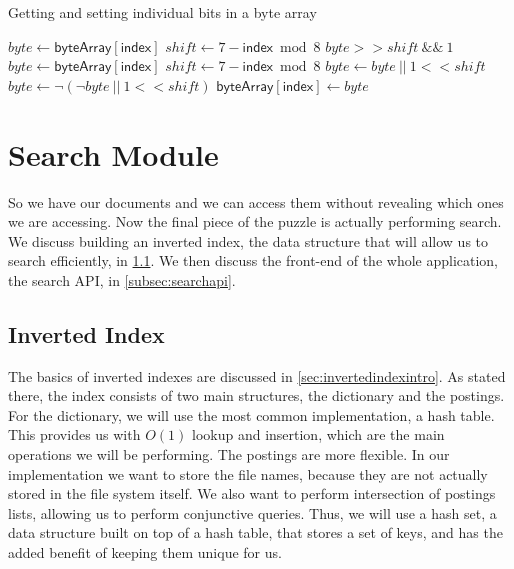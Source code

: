 \documentclass[12pt,a4paper,twoside,openright]{report}
\begin{document}
\begin{algorithm}[t]
\caption{Getting and setting individual bits in a byte array}
\label{alg:bitgetset}
\begin{algorithmic}
\vskip 10pt
  \State $byte \gets \mathsf{byteArray[index]}$
  \State $shift \gets 7 - \mathsf{index} \bmod 8$
  \State \Return $byte >> shift~\&\&~1$
\EndFunction
\vskip 10pt
  \State $byte \gets \mathsf{byteArray[index]}$
  \State $shift \gets 7 - \mathsf{index} \bmod 8$
    \State $byte \gets byte~||~1 << shift$
  \Else
    \State $byte \gets \neg (\neg byte~||~1 << shift)$
  \EndIf
  \State $\mathsf{byteArray[index]} \gets byte$
\EndFunction
\vskip 10pt
\end{algorithmic}
\end{algorithm}

\section{Search Module}
\label{sec:searchmodule}

So we have our documents and we can access them without revealing which ones we are accessing. Now the final piece of the puzzle is actually performing search. We discuss building an inverted index, the data structure that will allow us to search efficiently, in \cref{subsec:invertedindex}. We then discuss the front-end of the whole application, the search API, in \cref{subsec:searchapi}.

\subsection{Inverted Index}
\label{subsec:invertedindex}

The basics of inverted indexes are discussed in \cref{sec:invertedindexintro}. As stated there, the index consists of two main structures, the dictionary and the postings. For the dictionary, we will use the most common implementation, a hash table. This provides us with $O(1)$ lookup and insertion, which are the main operations we will be performing. The postings are more flexible. In our implementation we want to store the file names, because they are not actually stored in the file system itself. We also want to perform intersection of postings lists, allowing us to perform conjunctive queries. Thus, we will use a hash set, a data structure built on top of a hash table, that stores a set of keys, and has the added benefit of keeping them unique for us.
\end{document}
